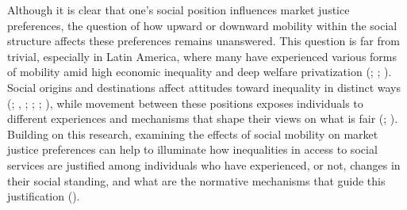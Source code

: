 \documentclass[
  12pt,
]{article}
\begin{document}
Although it is clear that one's social position influences market
justice preferences, the question of how upward or downward mobility
within the social structure affects these preferences remains
unanswered. This question is far from trivial, especially in Latin
America, where many have experienced various forms of mobility amid high
economic inequality and deep welfare privatization
(;
; ).
Social origins and destinations affect attitudes toward inequality in
distinct ways (;
,
;
; ; ), while
movement between these positions exposes individuals to different
experiences and mechanisms that shape their views on what is fair
(;
). Building on this
research, examining the effects of social mobility on market justice
preferences can help to illuminate how inequalities in access to social
services are justified among individuals who have experienced, or not,
changes in their social standing, and what are the normative mechanisms
that guide this justification ().
\end{document}

